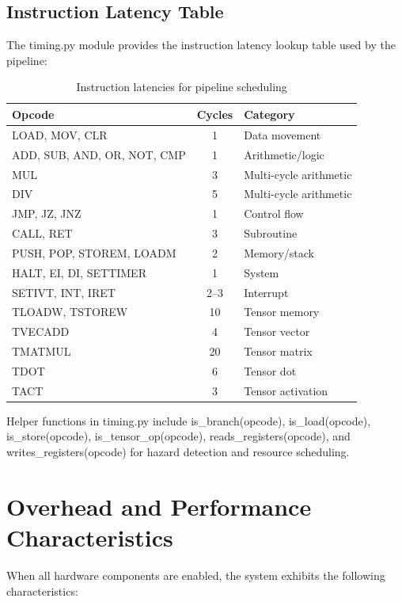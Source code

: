 \documentclass[12pt,a4paper,twoside]{book}
\theoremstyle{trinarytheorem}
\theoremstyle{trinarydefinition}
\newcommand{\code}[1]{\textsf{#1}}
\begin{document}
\subsection{Instruction Latency Table}

The \code{timing.py} module provides the instruction latency lookup table
used by the pipeline:

\begin{table}[H]
\centering
\caption{Instruction latencies for pipeline scheduling}
\label{tab:ilatencies}
\begin{tabular}{lcl}
\toprule
Opcode & Cycles & Category \\
\midrule
LOAD, MOV, CLR & 1 & Data movement \\
ADD, SUB, AND, OR, NOT, CMP & 1 & Arithmetic/logic \\
MUL & 3 & Multi-cycle arithmetic \\
DIV & 5 & Multi-cycle arithmetic \\
JMP, JZ, JNZ & 1 & Control flow \\
CALL, RET & 3 & Subroutine \\
PUSH, POP, STOREM, LOADM & 2 & Memory/stack \\
HALT, EI, DI, SETTIMER & 1 & System \\
SETIVT, INT, IRET & 2--3 & Interrupt \\
TLOADW, TSTOREW & 10 & Tensor memory \\
TVECADD & 4 & Tensor vector \\
TMATMUL & 20 & Tensor matrix \\
TDOT & 6 & Tensor dot \\
TACT & 3 & Tensor activation \\
\bottomrule
\end{tabular}
\end{table}

Helper functions in \code{timing.py} include \code{is\_branch(opcode)},
\code{is\_load(opcode)}, \code{is\_store(opcode)},
\code{is\_tensor\_op(opcode)}, \code{reads\_registers(opcode)}, and
\code{writes\_registers(opcode)} for hazard detection and resource
scheduling.

\section{Overhead and Performance Characteristics}

When all hardware components are enabled, the system exhibits the following
characteristics:
\end{document}
